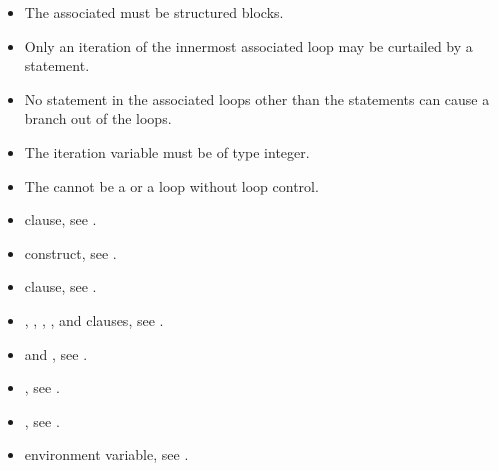 \begin{fortranspecific}
\begin{itemize}
\item The associated  must be structured blocks.
\item Only an iteration of the innermost associated loop may be curtailed 
      by a  statement.
\item No statement in the associated loops other than the  statements 
      can cause a branch out of the loops.
\item The  iteration variable must be of type integer.
\item The  cannot be a  or a  loop 
      without loop control.
\end{itemize}
\end{fortranspecific}

\crossreferences
\begin{itemize}
\item {} clause, see .

\item {} construct, see
.

\item {} clause, see
.

\item {}, , , , 
and  clauses, see .

\item {} and , see
  .

\item {}, see .

\item {}, see
.

\item {} environment variable, see
.
\end{itemize}




